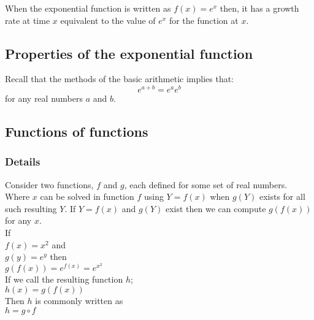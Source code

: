 \documentclass[12pt,a4paper]{article}
\theoremstyle{regla}
\theoremstyle{remark}
\theoremstyle{definition}
\theoremstyle{nonumberbreak}
\begin{document}
When the exponential function is written as $f(x)=e^x$ then, it has a growth rate at time $x$ equivalent to the value of $e^x$ for the function at $x$.



\subsection{Properties of the exponential function}
\begin{fbox}
\begin{minipage}{0.97\textwidth}
Recall that the methods of the basic arithmetic implies that:
$$
e^{a+b} = e^a e^b
$$ for any real numbers $a$ and $b$.
\end{minipage}
\end{fbox}

\subsection{Functions of functions}
\subsubsection{Details}
Consider two functions, $f$ and $g$, each defined for some set of real numbers. Where $x$ can be solved in function $f$ using $Y = f(x)$ when
$g(Y)$ exists for all such resulting $Y$. If $Y = f(x)$ and $g(Y)$ exist then we can compute $g(f(x))$ for any $x$. 
\\
If \\
$f(x) = {x}^2$ and \\
$  g(y)= {e}^y$ then \\
$g(f(x))= {e}^{f(x)} = {e}^{x^2}$\\

If we call the resulting function ${h}$;\\
$ h(x) = g(f(x))$\\
Then ${h}$ is commonly written as \\
$ {h} = {g}\circ{f}$\\
\\
\end{document}
